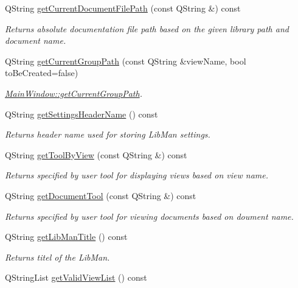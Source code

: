 \begin{DoxyCompactItemize}
Q\-String \hyperlink{classMainWindow_aa821e37fd6ba03b3e920e3bcf9290f56}{get\-Current\-Document\-File\-Path} (const Q\-String \&) const 
\begin{DoxyCompactList}\small\item\em Returns absolute documentation file path based on the given library path and document name. \end{DoxyCompactList}\item 
Q\-String \hyperlink{classMainWindow_a627010ec88cbfea1f08d7eb828df8497}{get\-Current\-Group\-Path} (const Q\-String \&view\-Name, bool to\-Be\-Created=false)
\begin{DoxyCompactList}\small\item\em \hyperlink{classMainWindow_a627010ec88cbfea1f08d7eb828df8497}{Main\-Window\-::get\-Current\-Group\-Path}. \end{DoxyCompactList}\item 
Q\-String \hyperlink{classMainWindow_ad191fe52bbc3ce40d18fb61f5655e562}{get\-Settings\-Header\-Name} () const 
\begin{DoxyCompactList}\small\item\em Returns header name used for storing Lib\-Man settings. \end{DoxyCompactList}\item 
Q\-String \hyperlink{classMainWindow_a37460aa0e52d6f1f7e4141824d371946}{get\-Tool\-By\-View} (const Q\-String \&) const 
\begin{DoxyCompactList}\small\item\em Returns specified by user tool for displaying views based on view name. \end{DoxyCompactList}\item 
Q\-String \hyperlink{classMainWindow_a1454fa08837579178f9a561675950f13}{get\-Document\-Tool} (const Q\-String \&) const 
\begin{DoxyCompactList}\small\item\em Returns specified by user tool for viewing documents based on doument name. \end{DoxyCompactList}\item 
Q\-String \hyperlink{classMainWindow_a4cf32e9db205b35bec796aeb55d2759a}{get\-Lib\-Man\-Title} () const 
\begin{DoxyCompactList}\small\item\em Returns titel of the Lib\-Man. \end{DoxyCompactList}\item 
Q\-String\-List \hyperlink{classMainWindow_a2e94b321482f5d6a970f0924f74859a3}{get\-Valid\-View\-List} () const 

\end{DoxyCompactItemize}
